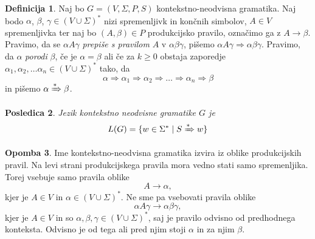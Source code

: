 \documentclass{amsart}
\theoremstyle{definition} %
\newtheorem{definicija}{Definicija}[section]
\newtheorem{opomba}[definicija]{Opomba}
\theoremstyle{plain} %
\newtheorem{posledica}[definicija]{Posledica}
\begin{document}
\begin{definicija}
    
    Naj bo $ G = ( V, \Sigma, P, S ) $ kontekstno-neodvisna gramatika. Naj bodo $ \alpha $,
    $ \beta $, $ \gamma \in ( V \cup \Sigma )^* $ nizi spremenljivk in končnih simbolov,
    $ A \in V $ spremenljivka ter naj bo $ ( A, \beta ) \in P $ produkcijsko pravilo,
    označimo ga z $ A \rightarrow \beta $. Pravimo, da se $ \alpha A \gamma $ 
    \textit{prepiše s pravilom} $ A $ v $ \alpha\beta\gamma $, pišemo $ \alpha A \gamma  \Rightarrow 
    \alpha\beta\gamma $. Pravimo, da $ \alpha $ \textit{porodi} $ \beta $, če je $ \alpha = \beta $ ali če
    za $ k \geq 0 $ obstaja zaporedje $ \alpha_1, \alpha_2, \ldots \alpha_n
    \in ( V \cup \Sigma )^* $ tako, da 
    \[
        \alpha \Rightarrow \alpha_1 \Rightarrow \alpha_2 \Rightarrow \ldots \Rightarrow \alpha_n
        \Rightarrow \beta
    \]
    in pišemo $ \alpha \xRightarrow{*} \beta $.

\end{definicija}

\begin{posledica}

    Jezik kontekstno neodvisne gramatike $ G $ je
    \[
        L(G) = \{ w \in \Sigma^* \mid S \xRightarrow{*} w \}
    \]

\end{posledica}

\begin{opomba}
    
    Ime kontekstno-neodvisna gramatika izvira iz oblike produkcijskih pravil. Na levi
    strani produkcijskega pravila mora vedno stati samo spremenljika. Torej vsebuje samo
    pravila oblike
    \[
        A \rightarrow \alpha,
    \]
    kjer je  $ A \in V $ in $ \alpha \in ( V \cup \Sigma )^* $. Ne sme pa vsebovati
    pravila oblike
    \[
        \alpha A \gamma \rightarrow \alpha\beta\gamma,
    \]
    kjer je $ A \in V $ in so $ \alpha, \beta, \gamma \in ( V \cup \Sigma )^* $, saj je
    pravilo odvisno od predhodnega konteksta. Odvisno je od tega ali pred njim stoji $ \alpha $
    in za njim $ \beta $.

\end{opomba}
\end{document}

